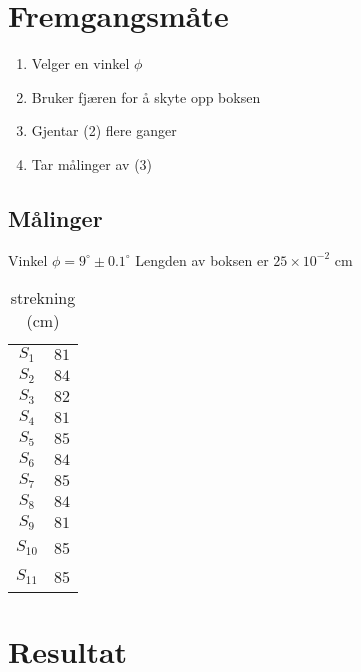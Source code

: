 \documentclass[a4paper]{article}
\begin{document}
\section{Fremgangsmåte} %
\label{sec:fremgangsmåte}
\begin{enumerate}
	\item Velger en vinkel $\phi$ 
	\item Bruker fjæren for å skyte opp boksen
	\item Gjentar (2) flere ganger
	\item Tar målinger av (3)
\end{enumerate}
\subsection{Målinger} %
\label{sub:målinger}
Vinkel $\phi = 9^{\circ} \pm 0.1^{\circ}$
Lengden av boksen er $25 \times 10^{-2}$ cm
\begin{table}[htpb]
	\centering
	\caption{strekning (cm)}
	\label{tab:label}
	\begin{tabular}{ c  c }
		$S_1$ & $81$ \\
		$S_2$ & $84$ \\
		$S_3$ & $82$ \\
		$S_4$ & $81$ \\
		$S_5$ & $85$ \\
		$S_6$ & $84$ \\
		$S_7$ & $85$ \\
		$S_8$ & $84$ \\
		$S_9$ & $81$ \\
		$S_{10}$ & 85 \\
		$S_{11}$ & 85 \\
	\end{tabular}
\end{table}
\newpage
\section{Resultat} %
\label{sec:resultat}
\end{document}
